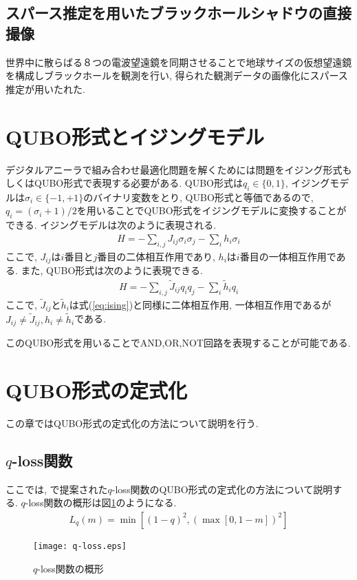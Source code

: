 \documentclass{jarticle}
\begin{document}
\subsection{スパース推定を用いたブラックホールシャドウの直接撮像}
世界中に散らばる８つの電波望遠鏡を同期させることで地球サイズの仮想望遠鏡を構成しブラックホールを観測を行い, 得られた観測データの画像化にスパース推定が用いたれた\cite{black_hole}. 
\section{QUBO形式とイジングモデル}
デジタルアニーラで組み合わせ最適化問題を解くためには問題をイジング形式もしくはQUBO形式で表現する必要がある.
QUBO形式は$q_{i}\in\{ 0,1\}$, イジングモデルは$\sigma_{i}\in\{ -1,+1\}$のバイナリ変数をとり, QUBO形式と等価であるので, $q_{i}=(\sigma_{i} +1)/2$を用いることでQUBO形式をイジングモデルに変換することができる.
イジングモデルは次のように表現される.
\begin{eqnarray}
  H=-\sum_{i,j}{J_{ij}\sigma_{i}\sigma_{j}}-\sum_{i}{h_{i}\sigma_{i}}  \label{eq:ising}
\end{eqnarray}
ここで, $J_{ij}$は$i$番目と$j$番目の二体相互作用であり, $h_{i}$は$i$番目の一体相互作用である. また, QUBO形式は次のように表現できる.
\begin{eqnarray}
  H=-\sum_{i,j}{\widetilde{J}_{ij}q_{i}q_{j}}-\sum_{i}{\widetilde{h}_{i} q_{i}}
\end{eqnarray}
ここで, $\widetilde{J}_{ij}$と$\widetilde{h}_{i}$は式(\ref{eq:ising})と同様に二体相互作用, 一体相互作用であるが$J_{ij}\neq \widetilde{J}_{ij}, h_{i}\neq \widetilde{h}_{i}$である.

このQUBO形式を用いることでAND,OR,NOT回路を表現することが可能である.

\section{QUBO形式の定式化}
この章ではQUBO形式の定式化の方法について説明を行う.

\subsection{$q$-loss関数} \label{sec:q-loss}
ここでは, \cite{bib:q-loss}で提案された$q$-loss関数のQUBO形式の定式化の方法について説明する. $q$-loss関数の概形は図\ref{fig:q-loss}のようになる.
\begin{eqnarray}
  L_{q}(m)=\min{[(1-q)^{2}, (\max{[0,1-m]})^{2}]} \label{eq:q-loss_before}
\end{eqnarray}
\begin{figure}[htbp]
  \begin{center}
    \vspace{-3cm}
    \texttt{[image: q-loss.eps]}
    \vspace{1.7cm}
    \caption{$q$-loss関数の概形}
    \label{fig:q-loss}
  \end{center}
\end{figure}
\end{document}
